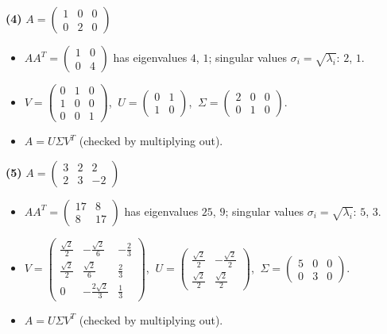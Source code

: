 \noindent\textbf{(4)} $A=\begin{pmatrix}1 & 0 & 0 \\ 0 & 2 & 0\end{pmatrix}$
\begin{itemize}\item $AA^T=\begin{pmatrix}1 & 0 \\ 0 & 4\end{pmatrix}$ has eigenvalues $4$, $1$; singular values $\sigma_i=\sqrt{\lambda_i}$: $2$, $1$.
\item $V=\begin{pmatrix}0 & 1 & 0 \\ 1 & 0 & 0 \\ 0 & 0 & 1\end{pmatrix}$, $\ U=\begin{pmatrix}0 & 1 \\ 1 & 0\end{pmatrix}$, $\ \Sigma=\begin{pmatrix}2 & 0 & 0 \\ 0 & 1 & 0\end{pmatrix}$.
\item $A=U\Sigma V^T$ (checked by multiplying out).\end{itemize}

\noindent\textbf{(5)} $A=\begin{pmatrix}3 & 2 & 2 \\ 2 & 3 & -2\end{pmatrix}$
\begin{itemize}\item $AA^T=\begin{pmatrix}17 & 8 \\ 8 & 17\end{pmatrix}$ has eigenvalues $25$, $9$; singular values $\sigma_i=\sqrt{\lambda_i}$: $5$, $3$.
\item $V=\begin{pmatrix}\frac{\sqrt{2}}{2} & - \frac{\sqrt{2}}{6} & - \frac{2}{3} \\ \frac{\sqrt{2}}{2} & \frac{\sqrt{2}}{6} & \frac{2}{3} \\ 0 & - \frac{2 \sqrt{2}}{3} & \frac{1}{3}\end{pmatrix}$, $\ U=\begin{pmatrix}\frac{\sqrt{2}}{2} & - \frac{\sqrt{2}}{2} \\ \frac{\sqrt{2}}{2} & \frac{\sqrt{2}}{2}\end{pmatrix}$, $\ \Sigma=\begin{pmatrix}5 & 0 & 0 \\ 0 & 3 & 0\end{pmatrix}$.
\item $A=U\Sigma V^T$ (checked by multiplying out).\end{itemize}

